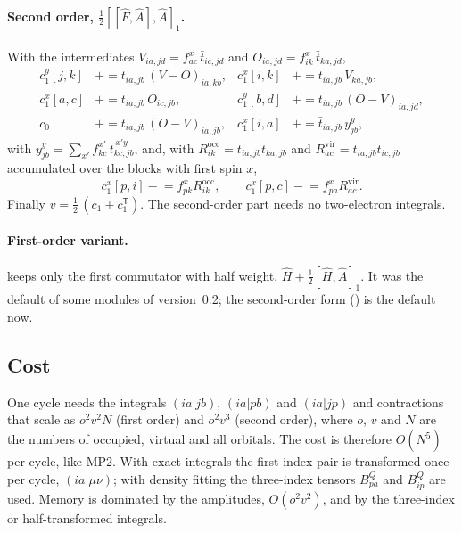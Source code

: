 \paragraph{Second order, $\tfrac12[[\hat F,\hat A],\hat A]_1$.}
With the intermediates $V_{ia,jd} = f^{x}_{ac}\,\bar t_{ic,jd}$ and
$O_{ia,jd} = f^{x}_{ik}\,\bar t_{ka,jd}$,
\begin{align}
  c_1^{y}[j,k] &\mathrel{+}= t_{ia,jb}\,(V-O)_{ia,kb}, &
  c_1^{x}[i,k] &\mathrel{+}= t_{ia,jb}\,V_{ka,jb}, \\
  c_1^{x}[a,c] &\mathrel{+}= t_{ia,jb}\,O_{ic,jb}, &
  c_1^{y}[b,d] &\mathrel{+}= t_{ia,jb}\,(O-V)_{ia,jd}, \\
  c_0 &\mathrel{+}= t_{ia,jb}\,(O-V)_{ia,jb}, &
  c_1^{x}[i,a] &\mathrel{+}= \bar t_{ia,jb}\,y^{y}_{jb},
\end{align}
with $y^{y}_{jb}=\sum_{x'} f^{x'}_{kc}\,\bar t^{\,x'y}_{kc,jb}$, and, with
$R^{\mathrm{occ}}_{ik} = t_{ia,jb}\bar t_{ka,jb}$ and
$R^{\mathrm{vir}}_{ac} = t_{ia,jb}\bar t_{ic,jb}$ accumulated over the blocks
with first spin $x$,
\begin{equation}
  c_1^{x}[p,i] \mathrel{-}= f^{x}_{pk}R^{\mathrm{occ}}_{ik},\qquad
  c_1^{x}[p,c] \mathrel{-}= f^{x}_{pa}R^{\mathrm{vir}}_{ac}.
\end{equation}
Finally $v = \tfrac12\,(c_1 + c_1^{\mathsf T})$. The second-order part needs
no two-electron integrals.

\paragraph{First-order variant.}
 keeps only the first commutator with half weight,
$\hat H + \tfrac12[\hat H,\hat A]_1$. It was the default of some modules of
version~0.2; the second-order form () is the default now.

\subsection{Cost}

One cycle needs the integrals $(ia|jb)$, $(ia|pb)$ and $(ia|jp)$ and
contractions that scale as $o^2v^2N$ (first order) and $o^2v^3$ (second
order), where $o$, $v$ and $N$ are the numbers of occupied, virtual and all
orbitals. The cost is therefore $O(N^5)$ per cycle, like MP2. With exact
integrals the first index pair is transformed once per cycle,
$(ia|\mu\nu)$; with density fitting the three-index tensors $B^Q_{pa}$ and
$B^Q_{ip}$ are used. Memory is dominated by the amplitudes, $O(o^2v^2)$, and
by the three-index or half-transformed integrals.

